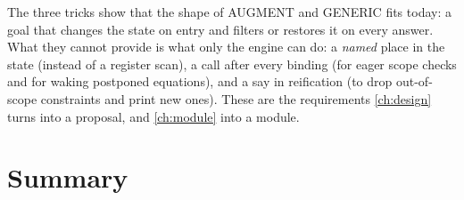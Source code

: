 \begin{kanren}
The three tricks show that the shape of AUGMENT and GENERIC fits \micro{} today: a goal that changes
the state on entry and filters or restores it on every answer. What they cannot provide is what only
the engine can do: a \emph{named} place in the state (instead of a register scan), a call after every
binding (for eager scope checks and for waking postponed equations), and a say in reification (to drop
out-of-scope constraints and print new ones). These are the requirements \cref{ch:design} turns into a
proposal, and \cref{ch:module} into a module.
\end{kanren}

\section{Summary}\label{sec:micro-summary}

